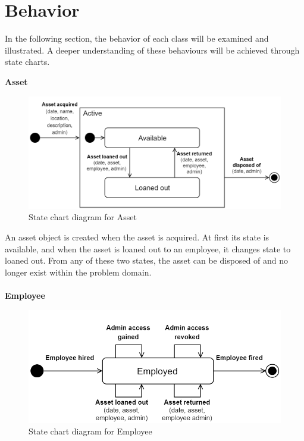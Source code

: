 \section{Behavior} \label{sc:behavoir}
In the following section, the behavior of each class will be examined and illustrated. A deeper understanding of these behaviours will be achieved through state charts.

\large{\textbf{Asset}}
\begin{figure}[H]
    \centering
    \includegraphics[width=1\textwidth]{figures/StateChart_Asset.png}
    \caption{State chart diagram for Asset}
    \label{fig:asset_statechart}
\end{figure}

An asset object is created when the asset is acquired. At first its state is available, and when the asset is loaned out to an employee, it changes state to loaned out. From any of these two states, the asset can be disposed of and no longer exist within the problem domain.
\\\\

\large{\textbf{Employee}}
\begin{figure}[H]
    \centering
    \includegraphics[width=1\textwidth]{figures/StateChart_Employee.png}
    \caption{State chart diagram for Employee}
    \label{fig:employee_statechart}
\end{figure}

